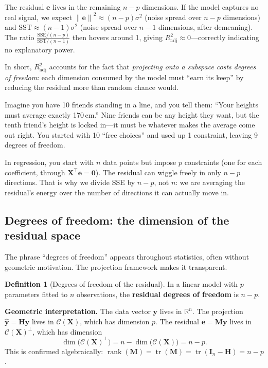 \documentclass[11pt,a4paper]{article}
\theoremstyle{plain}
\theoremstyle{definition}
\newtheorem{definition}[theorem]{Definition}
\newcommand{\R}{\mathbb{R}}
\newcommand{\yhat}{\hat{\bm{y}}}
\newcommand{\bX}{\bm{X}}
\newcommand{\by}{\bm{y}}
\newcommand{\be}{\bm{e}}
\newcommand{\bH}{\bm{H}}
\newcommand{\bM}{\bm{M}}
\newcommand{\bI}{\bm{I}}
\newcommand{\Col}{\mathcal{C}}
\newcommand{\norm}[1]{\left\lVert #1 \right\rVert}
\DeclareMathOperator{\tr}{tr}
\DeclareMathOperator{\rank}{rank}
\begin{document}
The residual $\be$ lives in the remaining $n-p$ dimensions.
If the model captures no real signal, we expect
$\norm{\be}^2 \approx (n-p)\sigma^2$ (noise spread over $n-p$ dimensions)
and $\text{SST} \approx (n-1)\sigma^2$ (noise spread over $n-1$ dimensions,
after demeaning).
The ratio $\frac{\text{SSE}/(n-p)}{\text{SST}/(n-1)}$ then hovers around 1,
giving $R^2_{\text{adj}} \approx 0$---correctly indicating no explanatory power.

In short, $R^2_{\text{adj}}$ accounts for the fact that \emph{projecting onto
a subspace costs degrees of freedom}: each dimension consumed by the model
must ``earn its keep'' by reducing the residual more than random chance would.

\begin{toystory}
Imagine you have 10 friends standing in a line, and you tell them:
``Your heights must average exactly 170\,cm.''
Nine friends can be any height they want, but the tenth friend's height
is locked in---it must be whatever makes the average come out right.
You started with 10 ``free choices'' and used up 1 constraint, leaving
9 degrees of freedom.

In regression, you start with $n$ data points but impose $p$ constraints
(one for each coefficient, through $\bX^\top\be = \bm{0}$).
The residual can wiggle freely in only $n - p$ directions.
That is why we divide SSE by $n-p$, not $n$: we are averaging the
residual's energy over the number of directions it can actually move in.
\end{toystory}

\subsection{Degrees of freedom: the dimension of the residual space}\label{sec:df}

The phrase ``degrees of freedom'' appears throughout statistics, often without
geometric motivation.  The projection framework makes it transparent.

\begin{definition}[Degrees of freedom of the residual]
In a linear model with $p$ parameters fitted to $n$ observations, the
\textbf{residual degrees of freedom} is $n - p$.
\end{definition}

\noindent\textbf{Geometric interpretation.}
The data vector $\by$ lives in $\R^n$.
The projection $\yhat = \bH\by$ lives in $\Col(\bX)$, which has dimension $p$.
The residual $\be = \bM\by$ lives in $\Col(\bX)^\perp$, which has dimension
\[
  \dim\bigl(\Col(\bX)^\perp\bigr) = n - \dim\bigl(\Col(\bX)\bigr) = n - p.
\]
This is confirmed algebraically: $\rank(\bM) = \tr(\bM) = \tr(\bI_n - \bH) = n - p$.
\end{document}

